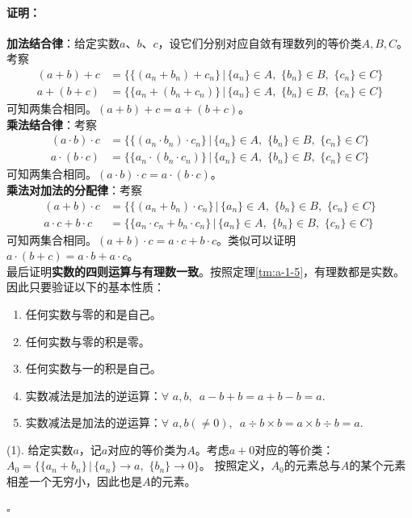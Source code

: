 \documentclass[12pt,UTF8]{ctexbook}
\renewenvironment{proof}{\paragraph{\textbf{证明：}}}{\hfill$\square$}
\begin{document}
\begin{appendix}
\begin{proof}
    \textbf{加法结合律}：给定实数$a$、$b$、$c$，设它们分别对应自敛有理数列的等价类$A,B,C$。考察
    \begin{align*}
        (a + b) + c &= \{\{(a_n + b_n) + c_n\} \, |\, \{a_n\}\in A,\,\,\{b_n\}\in B,\,\,\{c_n\}\in C \}  \\
        a + (b + c) &= \{\{a_n + (b_n + c_n)\} \, |\, \{a_n\}\in A,\,\,\{b_n\}\in B,\,\,\{c_n\}\in C \} 
    \end{align*}
    可知两集合相同。$(a + b) + c = a + (b + c)$。\\
    \textbf{乘法结合律}：考察
    \begin{align*}
        (a \cdot b) \cdot c &= \{\{(a_n \cdot b_n) \cdot c_n\} \, |\, \{a_n\}\in A,\,\,\{b_n\}\in B,\,\,\{c_n\}\in C \}  \\
        a \cdot (b \cdot c) &= \{\{a_n \cdot (b_n \cdot c_n)\} \, |\, \{a_n\}\in A,\,\,\{b_n\}\in B,\,\,\{c_n\}\in C \} 
    \end{align*}
    可知两集合相同。$(a \cdot b) \cdot c = a \cdot (b \cdot c)$。\\
    \textbf{乘法对加法的分配律}：考察
    \begin{align*}
        (a + b) \cdot c &= \{\{(a_n + b_n) \cdot c_n\} \, |\, \{a_n\}\in A,\,\,\{b_n\}\in B,\,\,\{c_n\}\in C \}  \\
        a \cdot c + b \cdot c &= \{\{a_n \cdot c_n + b_n \cdot c_n\} \, |\, \{a_n\}\in A,\,\,\{b_n\}\in B,\,\,\{c_n\}\in C \} 
    \end{align*}
    可知两集合相同。$(a + b) \cdot c = a \cdot c + b \cdot c$。类似可以证明$a \cdot (b + c) = a \cdot b + a \cdot c$。\\
    最后证明\textbf{实数的四则运算与有理数一致}。按照定理\ref{tm:a-1-5}，有理数都是实数。因此只要验证以下的基本性质：
    \begin{enumerate}
        \item 任何实数与零的和是自己。
        \item 任何实数与零的积是零。
        \item 任何实数与一的积是自己。
        \item 实数减法是加法的逆运算：$\forall \,\, a, b, \,\,\, a - b + b = a + b - b = a.$
        \item 实数减法是加法的逆运算：$\forall \,\, a, b(\neq 0), \,\,\, a \div b \times b = a\times b \div b = a.$
    \end{enumerate}
    (1). 给定实数$a$，记$a$对应的等价类为$A$。考虑$a+0$对应的等价类：$A_0 = \{ \{a_n + b_n\} \,|\, \{a_n\}\to a, \,\, \{b_n\} \to 0 \}$。
    按照定义，$A_0$的元素总与$A$的某个元素相差一个无穷小，因此也是$A$的元素。

\end{proof}
\end{appendix}
\end{document}
